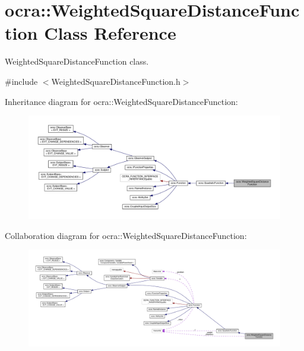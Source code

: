 \hypertarget{classocra_1_1WeightedSquareDistanceFunction}{}\section{ocra\+:\+:Weighted\+Square\+Distance\+Function Class Reference}
\label{classocra_1_1WeightedSquareDistanceFunction}


Weighted\+Square\+Distance\+Function class.  




{\ttfamily \#include $<$Weighted\+Square\+Distance\+Function.\+h$>$}



Inheritance diagram for ocra\+:\+:Weighted\+Square\+Distance\+Function\+:
\nopagebreak
\begin{figure}[H]
\begin{center}
\leavevmode
\includegraphics[width=350pt]{d8/dff/classocra_1_1WeightedSquareDistanceFunction__inherit__graph}
\end{center}
\end{figure}


Collaboration diagram for ocra\+:\+:Weighted\+Square\+Distance\+Function\+:
\nopagebreak
\begin{figure}[H]
\begin{center}
\leavevmode
\includegraphics[width=350pt]{d4/d37/classocra_1_1WeightedSquareDistanceFunction__coll__graph}
\end{center}
\end{figure}

